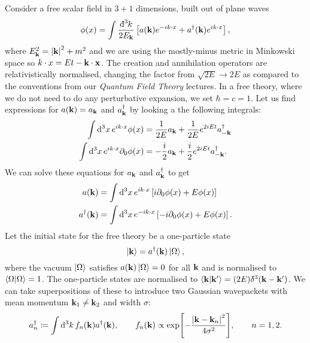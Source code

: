 Consider a free scalar field in $3 + 1$ dimensions, built out of plane waves
\begin{equation}
  \phi(x) = \int \frac{\bdd[3]{k}}{2E_{\vb{k}}} \left[ a(\vb{k}) e^{-i k \cdot x} + a^{\dagger} (\vb{k}) e^{i k \cdot x} \right],
\end{equation}
where $E_{\vb{k}}^2 = \abs{\vb{k}}^2 + m^2$ and we are using the mostly-minus metric in Minkowski space so $ k \cdot x = E t - \vb{k} \cdot \vb{x}$.
The creation and annihilation operators are relativistically normalised, changing the factor from $\sqrt{2 E} \to 2 E$  as compared to the conventions from our \emph{Quantum Field Theory} lectures.
In a free theory, where we do not need to do any perturbative expansion, we set $\hbar = c = 1$.
Let us find expressions for $a(\vb{k}) = a_{\vb{k}}$ and $a^{\dagger}_{\vb{k}}$ by looking a the following integrals:
\begin{align}
  \int \dd[3]{x} e^{i k \cdot x} \phi(x) &= \frac{1}{2E} a_{\vb{k}} + \frac{1}{2E} e^{2 i E t} a^{\dagger}_{-\vb{k}} \\
  \int \dd[3]{x} e^{i k \cdot x} \partial_0 \phi(x) &= -\frac{i}{2} a_{\vb{k}} + \frac{i}{2} e^{2 i E t} a^{\dagger}_{-\vb{k}}.
\end{align}
We can solve these equations for $a_{\vb{k}}$ and $a^{\dagger}_{\vb{k}}$ to get
\begin{align}
  a(\vb{k}) &= \int \dd[3]{x} e^{i k \cdot x} \left[ i \partial_0 \phi(x) + E \phi(x) \right] \\
  a^{\dagger}(\vb{k}) &= \int \dd[3]{x} e^{-i k \cdot x} \left[ -i \partial_0 \phi(x) + E \phi(x) \right]. \label{eq:7-a-dag}
\end{align}
Let the initial state for the free theory be a one-particle state
\begin{equation}
  \ket{\vb{k}} = a^{\dagger}(\vb{k}) \ket{\Omega},
\end{equation}
where the vacuum $\ket{\Omega}$ satisfies $a(\vb{k}) \ket{\Omega} = 0$ for all $\vb{k}$ and is normalised to $\bra{\Omega}\ket{\Omega} = 1$.
The one-particle states are normalised to $ \bra{\vb{k}} \ket{\vb{k}'} = (2 E) \bdelta^3(\vb{k} - \vb{k}')$.
We can take superpositions of these to introduce two Gaussian wavepackets with mean momentum $\vb{k}_1 \neq \vb{k}_2$ and width $\sigma$:
\begin{equation}
  \label{eq:7-free-gauss}
  a_n^{\dagger} \coloneqq \int \dd[3]{k} f_n (\vb{k}) a^{\dagger}(\vb{k}),
  \qquad f_n(\vb{k}) \propto \exp[- \frac{\abs{\vb{k} - \vb{k}_n}^2}{4 \sigma^2}], \qquad n = 1, 2.
\end{equation}


